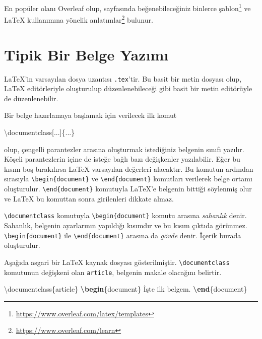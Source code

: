 \documentclass[
  10pt,
]{scrbook}
\newenvironment{Shaded}{}{}
\newcommand{\BuiltInTok}[1]{#1}
\newcommand{\ExtensionTok}[1]{#1}
\newcommand{\KeywordTok}[1]{\textcolor[rgb]{0.00,0.44,0.13}{\textbf{#1}}}
\newcommand{\NormalTok}[1]{#1}
\renewcommand{\href}[2]{#2\footnote{\url{#1}}}
\theoremstyle{definition}
\theoremstyle{definition}
\theoremstyle{definition}
\theoremstyle{definition}
\theoremstyle{remark}
\begin{document}
En popüler olanı Overleaf olup, sayfasında beğenebileceğiniz binlerce \href{https://www.overleaf.com/latex/templates}{şablon} ve LaTeX kullanımına yönelik \href{https://www.overleaf.com/learn}{anlatımlar} bulunur.

\hypertarget{tipik}{%
\section{Tipik Bir Belge Yazımı}\label{tipik}}

LaTeX'in varsayılan dosya uzantısı \texttt{.tex}'tir. Bu basit bir metin dosyası olup, LaTeX editörleriyle oluşturulup düzenlenebileceği gibi basit bir metin editörüyle de düzenlenebilir.

Bir belge hazırlamaya başlamak için verilecek ilk komut

\begin{Shaded}
\begin{Highlighting}[]
\BuiltInTok{\textbackslash{}documentclass}\NormalTok{[...]\{}\ExtensionTok{...}\NormalTok{\}}
\end{Highlighting}
\end{Shaded}

olup, çengelli parantezler arasına oluşturmak istediğiniz belgenin sınıfı yazılır. Köşeli parantezlerin içine de isteğe bağlı bazı değişkenler yazılabilir. Eğer bu kısım boş bırakılırsa LaTeX varsayılan değerleri alacaktır. Bu komutun ardından sırasıyla \texttt{\textbackslash{}begin\{document\}} ve \texttt{\textbackslash{}end\{document\}} komutları verilerek belge ortamı oluşturulur. \texttt{\textbackslash{}end\{document\}} komutuyla LaTeX'e belgenin bittiği söylenmiş olur ve LaTeX bu komuttan sonra girilenleri dikkate almaz.

\texttt{\textbackslash{}documentclass} komutuyla \texttt{\textbackslash{}begin\{document\}} komutu arasına \emph{sahanlık} denir. Sahanlık, belgenin ayarlarının yapıldığı kısımdır ve bu kısım çıktıda görünmez. \texttt{\textbackslash{}begin\{document\}} ile \texttt{\textbackslash{}end\{document\}} arasına da \emph{gövde} denir. İçerik burada oluşturulur.

Aşağıda asgari bir LaTeX kaynak dosyası gösterilmiştir. \texttt{\textbackslash{}documentclass} komutunun değişkeni olan \texttt{article}, belgenin makale olacağını belirtir.

\begin{Shaded}
\begin{Highlighting}[]
\BuiltInTok{\textbackslash{}documentclass}\NormalTok{\{}\ExtensionTok{article}\NormalTok{\}}
\KeywordTok{\textbackslash{}begin}\NormalTok{\{}\ExtensionTok{document}\NormalTok{\}}
\NormalTok{  İşte ilk belgem.}
\KeywordTok{\textbackslash{}end}\NormalTok{\{}\ExtensionTok{document}\NormalTok{\}}
\end{Highlighting}
\end{Shaded}
\end{document}
